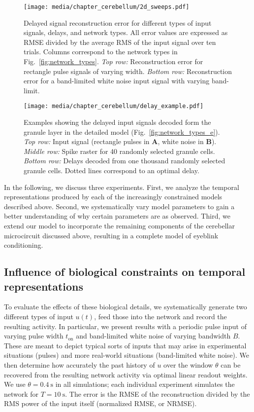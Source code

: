 \begin{figure}[t]
	\centering
	\texttt{[image: media/chapter\_cerebellum/2d\_sweeps.pdf]}
	\caption[Delayed signal reconstruction errors in the Cerebellum model.]{Delayed signal reconstruction error for different types of input signals, delays, and network types. All error values are expressed as RMSE divided by the average RMS of the input signal over ten trials. Columns correspond to the network types in Fig.~\ref{fig:network_types}. \emph{Top row:} Reconstruction error for rectangle pulse signals of varying width. \emph{Bottom row:} Reconstruction error for a band-limited white noise input signal with varying band-limit.}
	\label{fig:basic_results}
\end{figure}

\begin{figure}
	\centering
    \texttt{[image: media/chapter\_cerebellum/delay\_example.pdf]}
	\caption[Examples showing the delayed input signals decoded form the granule layer in the detailed model.]{Examples showing the delayed input signals decoded form the granule layer in the detailed model (Fig.~\ref{fig:network_types_e}). \emph{Top row:} Input signal (rectangle pulses in \textbf{A}, white noise in \textbf{B}). \emph{Middle row:} Spike raster for 40 randomly selected granule cells. \emph{Bottom row:} Delays decoded from one thousand randomly selected granule cells. Dotted lines correspond to an optimal delay.}
	\label{fig:sample_run}
\end{figure}

In the following, we discuss three experiments. First, we analyze the temporal representations produced by each of the increasingly constrained models described above. Second, we systematically vary model parameters to gain a better understanding of why certain parameters are as observed. Third, we extend our model to incorporate the remaining components of the cerebellar microcircuit discussed above, resulting in a complete model of eyeblink conditioning.

\subsection{Influence of biological constraints on temporal representations}

To evaluate the effects of these biological details, we systematically generate two different types of input $u(t)$, feed those into the network and record the resulting activity.
In particular, we present results with a periodic pulse input of varying pulse width $t_\mathrm{on}$ and band-limited white noise of varying bandwidth $B$. These are meant to depict typical sorts of inputs that may arise in experimental situations (pulses) and more real-world situations (band-limited white noise).
We then determine how accurately the past history of $u$ over the window $\theta$ can be recovered from the resulting network activity via optimal linear readout weights. We use $\theta = \SI{0.4}{\second}$ in all simulations; each individual experiment simulates the network for $T = \SI{10}{\second}$.
The error is the RMSE of the reconstruction divided by the RMS power of the input itself (normalized RMSE, or NRMSE).

